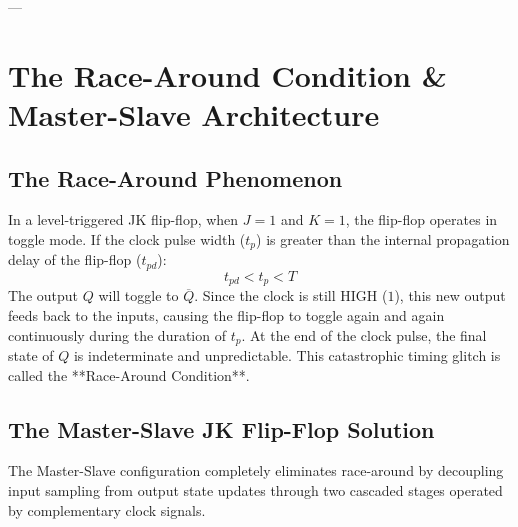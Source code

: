 ---

\section{The Race-Around Condition \& Master-Slave Architecture}

\subsection{The Race-Around Phenomenon}
In a level-triggered JK flip-flop, when $J = 1$ and $K = 1$, the flip-flop operates in toggle mode. If the clock pulse width ($t_p$) is greater than the internal propagation delay of the flip-flop ($t_{pd}$):
\begin{equation}
    t_{pd} < t_p < T
\end{equation}
The output $Q$ will toggle to $\overline{Q}$. Since the clock is still HIGH ($1$), this new output feeds back to the inputs, causing the flip-flop to toggle again and again continuously during the duration of $t_p$. At the end of the clock pulse, the final state of $Q$ is indeterminate and unpredictable. This catastrophic timing glitch is called the **Race-Around Condition**.

\subsection{The Master-Slave JK Flip-Flop Solution}
The Master-Slave configuration completely eliminates race-around by decoupling input sampling from output state updates through two cascaded stages operated by complementary clock signals.

